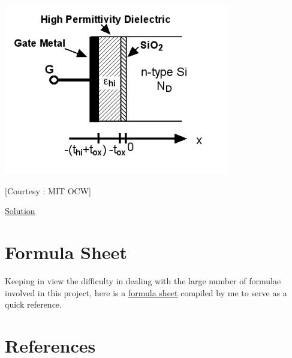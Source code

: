 \documentclass[12 pt]{article}
\begin{document}
\par
\begin{center}
    \includegraphics{Problem_5_1.png}
\end{center}
\par

\hspace{12 cm}[Courtesy : MIT OCW]

\href{https://drive.google.com/file/d/13iGpw3SyTD3zXcj59EY4Y-b9aaFxUMzM/view?usp=sharing}{Solution}

\section{Formula Sheet}
Keeping in view the difficulty in dealing with the large number of formulae involved in this project, here is a \href{https://drive.google.com/file/d/1jcVRobZqQsFGafdbbzfPG_H4w_CabpKo/view?usp=sharing}{formula sheet} compiled by me to serve as a quick reference.

\section{References}
\end{document}
